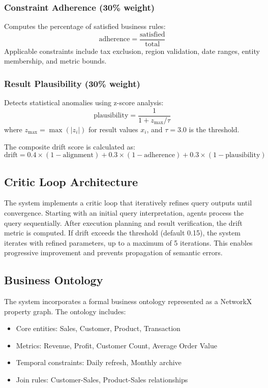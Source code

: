 \documentclass[conference]{IEEEtran}
\begin{document}
\subsubsection{Constraint Adherence (30\% weight)}
Computes the percentage of satisfied business rules:
\[
\text{adherence} = \frac{\text{satisfied}}{\text{total}}
\]
Applicable constraints include tax exclusion, region validation, date ranges, entity membership, and metric bounds.

\subsubsection{Result Plausibility (30\% weight)}
Detects statistical anomalies using z-score analysis:
\[
\text{plausibility} = \frac{1}{1 + z_{\max} / \tau}
\]
where $z_{\max} = \max(|z_i|)$ for result values $x_i$, and $\tau = 3.0$ is the threshold.

The composite drift score is calculated as:
\[
\text{drift} = 0.4 \times (1 - \text{alignment}) + 0.3 \times (1 - \text{adherence}) + 0.3 \times (1 - \text{plausibility})
\]

\subsection{Critic Loop Architecture}

The system implements a critic loop that iteratively refines query outputs until convergence. Starting with an initial query interpretation, agents process the query sequentially. After execution planning and result verification, the drift metric is computed. If drift exceeds the threshold (default 0.15), the system iterates with refined parameters, up to a maximum of 5 iterations. This enables progressive improvement and prevents propagation of semantic errors.

\subsection{Business Ontology}

The system incorporates a formal business ontology represented as a NetworkX property graph. The ontology includes:
\begin{itemize}
\item Core entities: Sales, Customer, Product, Transaction
\item Metrics: Revenue, Profit, Customer Count, Average Order Value
\item Temporal constraints: Daily refresh, Monthly archive
\item Join rules: Customer-Sales, Product-Sales relationships
\end{itemize}
\end{document}
